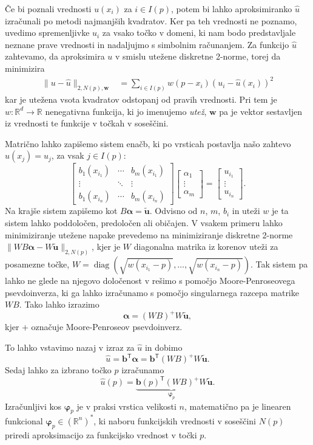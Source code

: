 \documentclass[12pt,a4paper]{article}
\theoremstyle{definition} %
\theoremstyle{plain} %
\newcommand{\R}{\mathbb R}
\newcommand{\T}{\mathsf{T}}
\renewcommand{\b}{\boldsymbol}
\renewcommand{\phi}{\varphi}
\newcommand{\uh}{\hat{u}}
\DeclareMathOperator{\diag}{diag}
\begin{document}
Če bi poznali vrednosti $u(x_i)$ za $i \in I(p)$, potem bi lahko aproksimiranko
$\uh$ izračunali po metodi najmanjših kvadratov. Ker pa teh vrednosti ne
poznamo, uvedimo spremenljivke $u_i$ za vsako točko v domeni, ki nam bodo
predstavljale neznane prave vrednosti in nadaljujmo
s simbolnim računanjem. Za funkcijo $\uh$ zahtevamo, da aproksimira $u$ v smislu
utežene diskretne 2-norme, torej da minimizira
\begin{align*}
  \|u-\uh\|_{2,N(p),\b{w}} &= \sum_{i\in I(p)} w(p-x_i) (u_i - \uh(x_i))^2
\end{align*}
kar je utežena vsota kvadratov odstopanj od pravih vrednosti. Pri tem je
$w\colon\R^d\to\R$ nenegativna funkcija, ki jo imenujemo \emph{utež}, $\b{w}$ pa
je vektor sestavljen iz vrednosti te funkcije v točkah v soseščini.

Matrično lahko zapišemo sistem enačb, ki po vrsticah
postavlja našo zahtevo $\hat{u}(x_j) = u_j$, za vsak $j \in I(p)$:
\[
\begin{bmatrix}
  b_1(x_{i_1}) & \cdots & b_m(x_{i_1}) \\
  \vdots & \ddots & \vdots   \\
  b_1(x_{i_n}) & \cdots & b_m(x_{i_n})
\end{bmatrix}
\begin{bmatrix}
  \alpha_1 \\ \vdots \\ \alpha_m
\end{bmatrix}
=
\begin{bmatrix}
  u_{i_1} \\ \vdots \\ u_{i_n}
\end{bmatrix}.
\]
Na krajše sistem zapišemo kot $B\b{\alpha} = \b{\tilde{u}}$. Odvisno od
$n$, $m$, $b_i$ in uteži $w$ je ta sistem lahko poddoločen, predoločen ali
običajen. V vsakem primeru lahko minimiziranje utežene napake prevedemo na
minimiziranje diskretne 2-norme $\|WB\b{\alpha}-W\b{\tilde{u}}\|_{2,N(p)}$, kjer je $W$
diagonalna matrika iz korenov uteži za posamezne točke, $W =
\diag(\sqrt{w(x_{i_1}-p)}, \dots, \sqrt{w(x_{i_n}-p)})$. Tak sistem pa lahko ne
glede na njegovo določenost v rešimo s pomočjo Moore-Penroseovega
psevdoinverza, ki ga lahko izračunamo s pomočjo singularnega razcepa matrike
$WB$.
Tako lahko izrazimo \[ \b{\alpha} = (WB)^{+}W\b{\tilde u}, \]
kjer $+$ označuje Moore-Penroseov psevdoinverz.

To lahko vstavimo nazaj v izraz za $\hat{u}$ in dobimo
\[
  \hat{u} = \b{b}^\T\b{\alpha} = \b{b}^\T(WB)^{+}W\b{\tilde{u}}.
\]
Sedaj lahko za izbrano točko $p$ izračunamo
\[
  \hat{u}(p) = \underbrace{\b{b}(p)^\T(WB)^{+}W}_{\b\phi_p}\b{\tilde{u}}.
\]
Izračunljivi kos $\b\phi_p$ je v praksi vrstica velikosti $n$, matematično pa je
linearen funkcional $\b\phi_p \in (\R^n)^\ast$, ki naboru funkcijskih vrednosti v
soseščini $N(p)$ priredi aproksimacijo za funkcijsko vrednost v točki $p$.
\end{document}
